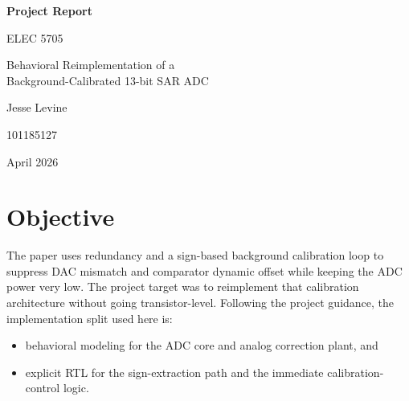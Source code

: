 \documentclass[11pt]{article}
\begin{document}
\begin{titlepage}
\centering
\vspace*{1.8cm}
{\Huge \bfseries Project Report\par}
\vspace{0.45cm}
{\Large ELEC 5705\par}
\vspace{0.7cm}
{\Large Behavioral Reimplementation of a\\Background-Calibrated 13-bit SAR ADC\par}
\vfill
{\Large Jesse Levine\par}
\vspace{0.3cm}
{\large 101185127\par}
\vspace{1.2cm}
{\large April 2026\par}
\end{titlepage}

\begin{abstract}
This project reimplements the background calibration architecture of the 46~$\mu$W, 13-bit, 6.4~MS/s SAR ADC reported by Ding \emph{et al.} using a hybrid methodology. The ADC core, DAC mismatch, comparator modes, and analog correction path are modeled behaviorally, while the sign extraction and immediate calibration-control path are implemented explicitly in RTL. The final model reproduces sparse background operation and converges in 384243 conversions with an active calibration rate of approximately 1.37\%, close to the paper's reported convergence scale of roughly 400k cycles.
\end{abstract}

\section{Objective}
The paper \cite{ding2017} uses redundancy and a sign-based background calibration loop to suppress DAC mismatch and comparator dynamic offset while keeping the ADC power very low. The project target was to reimplement that calibration architecture without going transistor-level. Following the project guidance, the implementation split used here is:
\begin{itemize}
    \item behavioral modeling for the ADC core and analog correction plant, and
    \item explicit RTL for the sign-extraction path and the immediate calibration-control logic.
\end{itemize}
\end{document}
